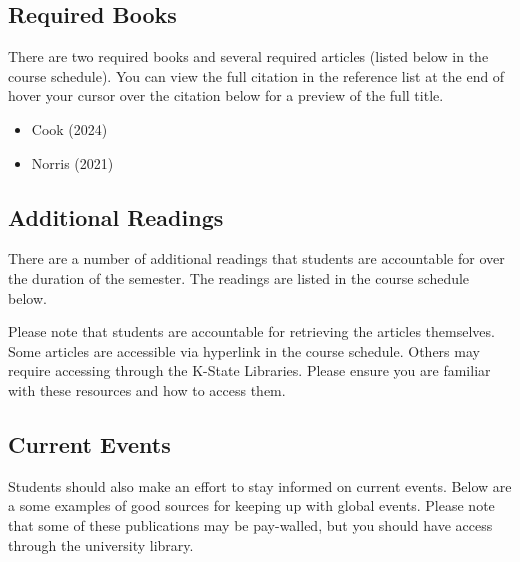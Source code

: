 \documentclass[
  letterpaper,
  DIV=11,
  numbers=noendperiod]{scrartcl}
\providecommand{\tightlist}{%
  \setlength{\itemsep}{0pt}\setlength{\parskip}{0pt}}
\begin{document}
\subsection{Required Books}\label{required-books}

There are two required books and several required articles (listed below
in the course schedule). You can view the full citation in the reference
list at the end of hover your cursor over the citation below for a
preview of the full title.

\begin{itemize}
\tightlist
\item
  Cook (2024)
\item
  Norris (2021)
\end{itemize}

\subsection{Additional Readings}\label{additional-readings}

There are a number of additional readings that students are accountable
for over the duration of the semester. The readings are listed in the
course schedule below.

Please note that students are accountable for retrieving the articles
themselves. Some articles are accessible via hyperlink in the course
schedule. Others may require accessing through the K-State Libraries.
Please ensure you are familiar with these resources and how to access
them.

\subsection{Current Events}\label{current-events}

Students should also make an effort to stay informed on current events.
Below are a some examples of good sources for keeping up with global
events. Please note that some of these publications may be pay-walled,
but you should have access through the university library.
\end{document}
